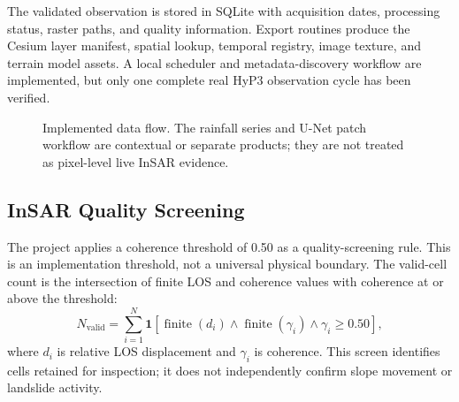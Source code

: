 \documentclass[conference]{IEEEtran}
\begin{document}
The validated observation is stored in SQLite with acquisition dates,
processing status, raster paths, and quality information. Export routines
produce the Cesium layer manifest, spatial lookup, temporal registry, image
texture, and terrain model assets. A local scheduler and metadata-discovery
workflow are implemented, but only one complete real HyP3 observation cycle
has been verified.

\begin{figure}[t]
\centering
{}
\caption{Implemented data flow. The rainfall series and U-Net patch workflow are contextual or separate products; they are not treated as pixel-level live InSAR evidence.}
\label{fig:architecture}
\end{figure}

\subsection{InSAR Quality Screening}
The project applies a coherence threshold of 0.50 as a quality-screening
rule. This is an implementation threshold, not a universal physical boundary.
The valid-cell count is the intersection of finite LOS and coherence values
with coherence at or above the threshold:
\begin{equation}
N_{\mathrm{valid}} =
\sum_{i=1}^{N}
\mathbf{1}\left[
\operatorname{finite}(d_i)
\land \operatorname{finite}(\gamma_i)
\land \gamma_i \geq 0.50
\right],
\label{eq:quality}
\end{equation}
where $d_i$ is relative LOS displacement and $\gamma_i$ is coherence. This
screen identifies cells retained for inspection; it does not independently
confirm slope movement or landslide activity.
\end{document}
